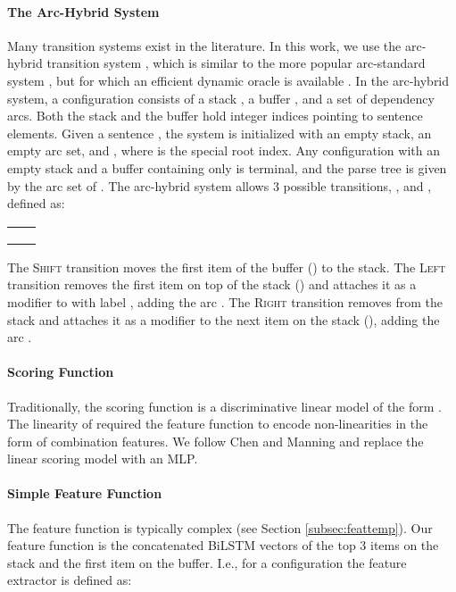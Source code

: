 \documentclass[11pt]{article}
\begin{document}
\paragraph{The Arc-Hybrid System}
Many transition systems exist in the literature. In this work, we use the
arc-hybrid transition system \cite{kuhlmann2011}, which is similar to the more
popular arc-standard system \cite{arc-eager}, but for which an efficient
dynamic oracle is available \cite{coling2012dynamic,tacl2013dynamic}.
In the arc-hybrid system, a configuration  consists of a
stack , a buffer , and a set  of dependency arcs. 
Both the stack and the buffer hold integer indices pointing to sentence elements.
Given a sentence , the system
is initialized with an empty stack, an empty arc set, and  , where  is
the special root index. Any configuration  with an empty stack and a buffer
containing only  is
terminal, and the parse tree is given by the arc set  of .
The arc-hybrid system allows 3 possible transitions,
,  and , defined
as:
\vspace{-5pt}
\begin{center}
\begin{scalebox}{0.8}{
\begin{tabular}{ll}
     & \\
     & \\
     & \\
\end{tabular}}\end{scalebox}
\end{center}
\vspace{5pt}

\noindent The \textsc{Shift} transition moves the first item of the buffer () to the stack.
The \textsc{Left} transition removes the first item on top of the stack
() and attaches it as a modifier to  with label , adding the arc .
The \textsc{Right} transition removes  from the stack and attaches
it as a modifier to the next item on the stack (), adding the arc
.

\paragraph{Scoring Function}
Traditionally, the scoring function  is a
discriminative linear model of the form .
The linearity of  required the feature function  to encode
non-linearities in the form of combination features.  We
follow Chen and Manning  and replace the linear scoring
model with an MLP.


\paragraph{Simple Feature Function}
The feature function  is typically complex (see Section \ref{subsec:feattemp}).
Our feature function is the concatenated \mbox{BiLSTM} vectors of the top 3 items on the
stack and the first item on the buffer.
I.e., for a configuration 
the feature extractor is defined as:
\end{document}
